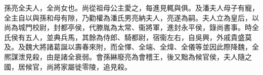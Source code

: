 \begin{pinyinscope}
 
 
 孫亮全夫人，全尚女也。尚從祖母公主愛之，每進見輒與俱。及潘夫人母子有寵，全主自以與孫和母有隙，乃勸權為潘氏男亮納夫人，亮遂為嗣。夫人立為皇后，以尚為城門校尉，封都亭侯，代滕胤為太常、衞將軍，進封永平侯，錄尚書事。時全氏侯有五人，並典兵馬，其餘為侍郎、騎都尉，宿衞左右，自吳興，外戚貴盛莫及。及魏大將諸葛誕以壽春來附，而全懌、全端、全煒、全儀等並因此際降魏，全熈謀泄見殺，由是諸全衰弱。會孫綝廢亮為會稽王，後又黜為候官侯，夫人隨之國，居候官，尚將家屬徙零陵，追見殺。
 
 
 
 
\end{pinyinscope}